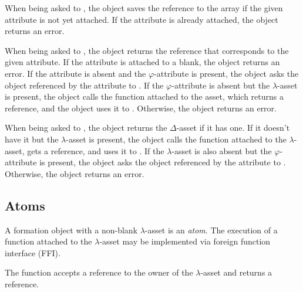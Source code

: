 When being asked to , the object saves the reference to the array if the given attribute is not yet attached.
If the attribute is already attached, the object returns an error.

When being asked to , the object returns the reference that corresponds to the given attribute.
If the attribute is attached to a blank, the object returns an error.
If the attribute is absent and the \(\varphi\)-attribute is present, the object asks the object referenced by the attribute to .
If the \(\varphi\)-attribute is absent but the \(\lambda\)-asset is present, the object calls the function attached to the asset, which returns a reference, and the object uses it to .
Otherwise, the object returns an error.

When being asked to , the object returns the \(\Delta\)-asset if it has one.
If it doesn't have it but the \(\lambda\)-asset is present, the object calls the function attached to the \(\lambda\)-asset, gets a reference, and uses it to .
If the \(\lambda\)-asset is also absent but the \(\varphi\)-attribute is present, the object asks the object referenced by the attribute to .
Otherwise, the object returns an error.

\subsection{Atoms}

A formation object with a non-blank \(\lambda\)-asset is an \emph{atom}.
The execution of a function attached to the \(\lambda\)-asset may be implemented via foreign function interface (FFI).

The function accepts a reference to the owner of the \(\lambda\)-asset and returns a reference.
